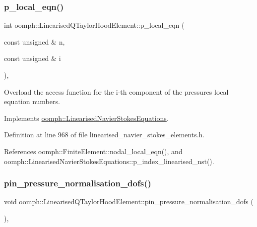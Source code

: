 \subsubsection{\texorpdfstring{p\+\_\+local\+\_\+eqn()}{p\_local\_eqn()}}
{\footnotesize\ttfamily int oomph\+::\+Linearised\+Q\+Taylor\+Hood\+Element\+::p\+\_\+local\+\_\+eqn (\begin{DoxyParamCaption}\item[{const unsigned \&}]{n,  }\item[{const unsigned \&}]{i }\end{DoxyParamCaption})\hspace{0.3cm}{\ttfamily [inline]}, {\ttfamily [virtual]}}



Overload the access function for the i-\/th component of the pressure\textquotesingle{}s local equation numbers. 



Implements \hyperlink{classoomph_1_1LinearisedNavierStokesEquations_a41fac6d78bdecf58d625ecbc95593a03}{oomph\+::\+Linearised\+Navier\+Stokes\+Equations}.



Definition at line 968 of file linearised\+\_\+navier\+\_\+stokes\+\_\+elements.\+h.



References oomph\+::\+Finite\+Element\+::nodal\+\_\+local\+\_\+eqn(), and oomph\+::\+Linearised\+Navier\+Stokes\+Equations\+::p\+\_\+index\+\_\+linearised\+\_\+nst().

\mbox{\label{classoomph_1_1LinearisedQTaylorHoodElement_a21bc414ed57b79f986d4f1bff6cece4b}} 
\subsubsection{\texorpdfstring{pin\+\_\+pressure\+\_\+normalisation\+\_\+dofs()}{pin\_pressure\_normalisation\_dofs()}}
{\footnotesize\ttfamily void oomph\+::\+Linearised\+Q\+Taylor\+Hood\+Element\+::pin\+\_\+pressure\+\_\+normalisation\+\_\+dofs (\begin{DoxyParamCaption}{ }\end{DoxyParamCaption})\hspace{0.3cm}{\ttfamily [inline]}, {\ttfamily [virtual]}}



